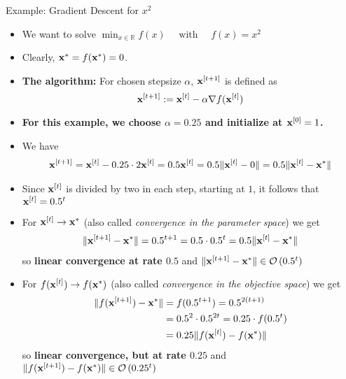 \documentclass[11pt,compress,t,notes=noshow, xcolor=table]{beamer}
\begin{document}
\begin{vbframe}{Example: Gradient Descent for $x^2$}
\begin{itemize}
  \item We want to solve $\min_{x\in\mathbb R} f(x) \quad \text{ with } \quad f(x) = x^2$
  \item Clearly, $\mathbf{x}^\ast=f(\mathbf{x}^\ast)=0$.
   \item \textbf{The algorithm:}   For chosen stepsize $\alpha$, $\mathbf{x}^{[t+1]}$ is defined as
    \[
    \mathbf{x}^{[t+1]} := \mathbf{x}^{[t]} - \alpha \nabla f(\mathbf{x}^{[t]})         
    \] 
    \item \textbf{For this example, we choose $\alpha=0.25$ and initialize at $\mathbf{x}^{[0]}=1$.}\\[20pt]
        \item We have \begin{align*}
        \mathbf{x}^{[t+1]}= \mathbf{x}^{[t]}-0.25\cdot 2\mathbf{x}^{[t]} =0.5\mathbf{x}^{[t]}=0.5\|\mathbf{x}^{[t]}-0\|=  0.5\|\mathbf{x}^{[t]}-\mathbf{x}^\ast\|
        \end{align*}
    \item Since $\mathbf{x}^{[t]}$ is divided by two in each step, starting at $1$, it follows that $\mathbf{x}^{[t]}=0.5^t$
    \end{itemize}
    \framebreak
    \begin{itemize}
        \item For $\mathbf{x}^{[t]} \to \mathbf{x}^\ast$ (also called \emph{convergence in the parameter space}) we get
        \begin{align*}
            \|\mathbf{x}^{[t+1]}- \mathbf{x}^\ast\| = 0.5^{t+1}=0.5\cdot0.5^t=0.5\|\mathbf{x}^{[t]}-\mathbf{x}^\ast\| 
        \end{align*}
        so \textbf{linear convergence at rate $\bm{0.5}$} and $\|\mathbf{x}^{[t+1]}- \mathbf{x}^\ast\|\in\mathcal{O}\left(0.5^t\right)$\\[15pt]
        \item For $f(\mathbf{x}^{[t]} ) \to f(\mathbf{x}^\ast)$ (also called \emph{convergence in the objective space}) we get
                \begin{align*}
            \|f(\mathbf{x}^{[t+1]})- \mathbf{x}^\ast\| &= f(0.5^{t+1})=0.5^{2(t+1)}\\&=0.5^2\cdot0.5^{2t}=0.25\cdot f(0.5^t)\\
            &=0.25\|f(\mathbf{x}^{[t]})-f(\mathbf{x}^\ast)\| 
        \end{align*}so \textbf{linear convergence, but at rate $\bm{0.25}$} and $\|f(\mathbf{x}^{[t+1]})- f(\mathbf{x}^\ast)\|\in\mathcal{O}\left(0.25^{t}\right)$
        
    \end{itemize}
\end{vbframe}

\endlecture
\end{document}
